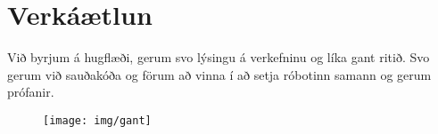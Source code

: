 ﻿\section{Verkáætlun}
Við byrjum á hugflæði, gerum svo lýsingu á verkefninu og líka gant ritið. Svo gerum við sauðakóða og förum að vinna í að setja róbotinn samann og gerum prófanir.
\begin{figure}[h]
\texttt{[image: img/gant]}
\end{figure}
